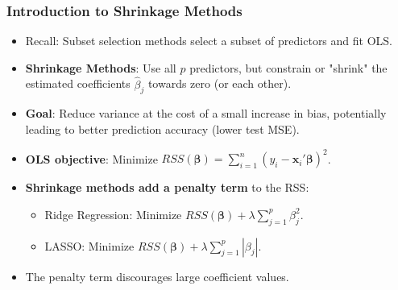 \documentclass[12pt,a4paper]{article}
\begin{document}
\begin{itemize}
\begin{itemize}
    \subsubsection{Introduction to Shrinkage Methods }
        \begin{itemize}
            \item Recall: Subset selection methods select a subset of predictors and fit OLS.
            \item \textbf{Shrinkage Methods}: Use all $p$ predictors, but constrain or "shrink" the estimated coefficients $\hat{\beta}_j$ towards zero (or each other).
            \item \textbf{Goal}: Reduce variance at the cost of a small increase in bias, potentially leading to better prediction accuracy (lower test MSE).
            \item \textbf{OLS objective}: Minimize $RSS(\boldsymbol{\beta}) = \sum_{i=1}^{n} (y_i - \mathbf{x}_i'\boldsymbol{\beta})^2$.
            \item \textbf{Shrinkage methods add a penalty term} to the RSS:
                \begin{itemize}
                    \item Ridge Regression: Minimize $RSS(\boldsymbol{\beta}) + \lambda \sum_{j=1}^{p} \beta_j^2$.
                    \item LASSO: Minimize $RSS(\boldsymbol{\beta}) + \lambda \sum_{j=1}^{p} |\beta_j|$.
                \end{itemize}
            \item The penalty term discourages large coefficient values.
        \end{itemize}


\end{itemize}
\end{itemize}
\end{document}
